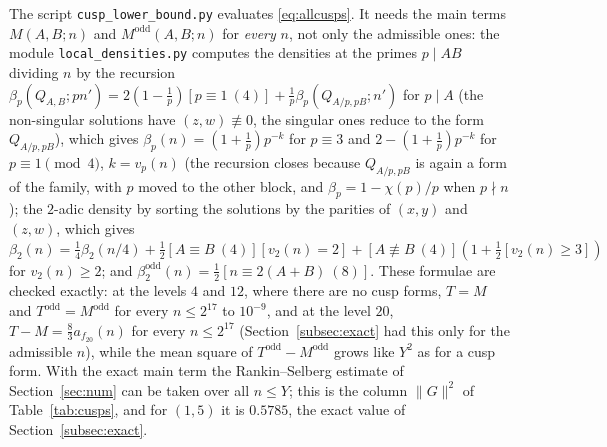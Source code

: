 ﻿\documentclass[11pt]{amsart}
\theoremstyle{remark}
\begin{document}
The script \texttt{cusp\_lower\_bound.py} evaluates \eqref{eq:allcusps}. It needs the main terms $M(A,B;n)$ and $M^{\mathrm{odd}}(A,B;n)$ for \emph{every} $n$, not only the admissible ones: the module \texttt{local\_densities.py} computes the densities at the primes $p\mid AB$ dividing $n$ by the recursion $\beta_p(Q_{A,B};pn')=2(1-\frac1p)[p\equiv1\ (4)]+\frac1p\beta_p(Q_{A/p,pB};n')$ for $p\mid A$ (the non-singular solutions have $(z,w)\not\equiv0$, the singular ones reduce to the form $Q_{A/p,pB}$), which gives $\beta_p(n)=(1+\frac1p)p^{-k}$ for $p\equiv3$ and $2-(1+\frac1p)p^{-k}$ for $p\equiv1\pmod4$, $k=v_p(n)$ (the recursion closes because $Q_{A/p,pB}$ is again a form of the family, with $p$ moved to the other block, and $\beta_p=1-\chi(p)/p$ when $p\nmid n$); the $2$-adic density by sorting the solutions by the parities of $(x,y)$ and $(z,w)$, which gives $\beta_2(n)=\frac14\beta_2(n/4)+\frac12[A\equiv B\ (4)][v_2(n)=2]+[A\not\equiv B\ (4)](1+\frac12[v_2(n)\ge3])$ for $v_2(n)\ge2$; and $\beta_2^{\mathrm{odd}}(n)=\frac12[n\equiv2(A+B)\ (8)]$. These formulae are checked exactly: at the levels $4$ and $12$, where there are no cusp forms, $T=M$ and $T^{\mathrm{odd}}=M^{\mathrm{odd}}$ for every $n\le2^{17}$ to $10^{-9}$, and at the level $20$, $T-M=\frac83a_{f_{20}}(n)$ for every $n\le2^{17}$ (Section~\ref{subsec:exact} had this only for the admissible $n$), while the mean square of $T^{\mathrm{odd}}-M^{\mathrm{odd}}$ grows like $Y^2$ as for a cusp form. With the exact main term the Rankin--Selberg estimate of Section~\ref{sec:num} can be taken over all $n\le Y$; this is the column $\|G\|^2$ of Table~\ref{tab:cusps}, and for $(1,5)$ it is $0.5785$, the exact value of Section~\ref{subsec:exact}.
\end{document}
